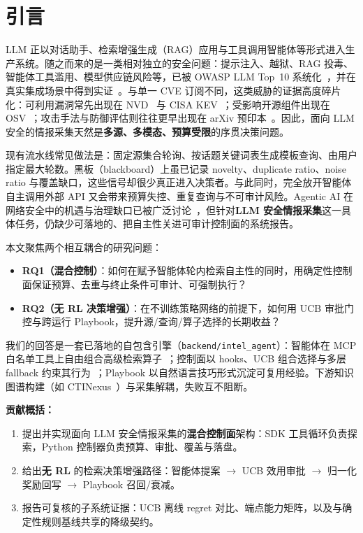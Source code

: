 \documentclass[conference]{IEEEtran}
\begin{document}
\section{引言}
\label{sec:intro}

LLM 正以对话助手、检索增强生成（RAG）应用与工具调用智能体等形式进入生产系统。随之而来的是一类相对独立的安全问题：提示注入、越狱、RAG 投毒、智能体工具滥用、模型供应链风险等，已被 OWASP LLM Top~10 系统化~\cite{owasp2025llmtop10}，并在真实集成场景中得到实证~\cite{greshake2023injection}。与单一 CVE 订阅不同，这类威胁的证据高度碎片化：可利用漏洞常先出现在 NVD~\cite{nvd} 与 CISA KEV~\cite{cisakev}；受影响开源组件出现在 OSV~\cite{osv}；攻击手法与防御评估则往往更早出现在 arXiv 预印本~\cite{arxivapi}。因此，面向 LLM 安全的情报采集天然是\textbf{多源、多模态、预算受限}的序贯决策问题。

现有流水线常见做法是：固定源集合轮询、按话题关键词表生成模板查询、由用户指定最大轮数。黑板（blackboard）上虽已记录 novelty、duplicate ratio、noise ratio 与覆盖缺口，这些信号却很少真正进入决策者。与此同时，完全放开智能体自主调用外部 API 又会带来预算失控、重复查询与不可审计风险。Agentic AI 在网络安全中的机遇与治理缺口已被广泛讨论~\cite{kshetri2025agentic,lazer2026survey}，但针对\textbf{LLM 安全情报采集}这一具体任务，仍缺少可落地的、把自主性关进可审计控制面的系统报告。

本文聚焦两个相互耦合的研究问题：
\begin{itemize}
  \item \textbf{RQ1（混合控制）}：如何在赋予智能体轮内检索自主性的同时，用确定性控制面保证预算、去重与终止条件可审计、可强制执行？
  \item \textbf{RQ2（无 RL 决策增强）}：在不训练策略网络的前提下，如何用 UCB 审批门控与跨运行 Playbook，提升源/查询/算子选择的长期收益？
\end{itemize}

我们的回答是一套已落地的自包含引擎（\texttt{backend/intel\_agent}）：智能体在 MCP 白名单工具上自由组合高级检索算子~\cite{anthropicmcp,claudeagentsdk}；控制面以 hooks、UCB 组合选择与多层 fallback 约束其行为~\cite{claudeagenthooks}；Playbook 以自然语言技巧形式沉淀可复用经验。下游知识图谱构建（如 CTINexus~\cite{cheng2025ctinexus}）与采集解耦，失败互不阻断。

\noindent\textbf{贡献概括：}
\begin{enumerate}
  \item 提出并实现面向 LLM 安全情报采集的\textbf{混合控制面}架构：SDK 工具循环负责探索，Python 控制器负责预算、审批、覆盖与落盘。
  \item 给出\textbf{无 RL} 的检索决策增强路径：智能体提案 $\rightarrow$ UCB 效用审批 $\rightarrow$ 归一化奖励回写 $\rightarrow$ Playbook 召回/衰减。
  \item 报告可复核的子系统证据：UCB 离线 regret 对比、端点能力矩阵，以及与确定性规则基线共享的降级契约。
\end{enumerate}
\end{document}

